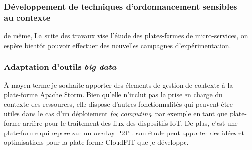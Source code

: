 \subsubsection*{Développement de techniques d'ordonnancement sensibles au contexte}

de même, La suite des travaux vise l'étude des plates-formes de micro-services, on espère bientôt pouvoir effectuer des nouvelles campagnes d'expérimentation.



\subsubsection*{Adaptation d'outils \textit{big data}}

À moyen terme je souhaite apporter des élements de gestion de contexte à la plate-forme Apache Storm. Bien qu'elle n'inclut pas la prise en charge du contexte des ressources, elle dispose d'autres fonctionnalités qui peuvent être utiles dans le cas d'un déploiement \textit{fog computing}, par exemple en tant que plate-forme arrière pour le traitement des flux des dispositifs IoT. De plus, c'est une plate-forme qui repose sur un overlay P2P : son étude peut apporter des idées et optimisations pour la plate-forme CloudFIT que je développe.



